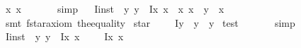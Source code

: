 \begin{isabellebody}
\isanewline
\isanewline
{}\isamarkupfalse%
\ {\isachardoublequoteopen}{\isacharparenleft}\isactrlbold {\isasymexists}x{\isachardot}\ x\ \isactrlbold {\isacharequal}\ {\isasymalpha}{\isacharparenright}\ {\isasymlongrightarrow}\ {\isasymA}{\isacharparenleft}{\isasymalpha}{\isacharparenright}{\isachardoublequoteclose}%
\isadelimproof
\ %
\endisadelimproof
%
\isatagproof
{}\isamarkupfalse%
\ simp%
\endisatagproof
{\isafoldproof}%
%
\isadelimproof
%
\endisadelimproof
\isanewline
\ \isanewline
\isanewline
\isanewline
{}\isamarkupfalse%
\ I{}{\isacharunderscore}inst\ {\isacharcolon}\ {\isachardoublequoteopen}\isactrlbold {\isasymforall}y{\isachardot}\ {\isacharparenleft}{\isacharparenleft}y\ \isactrlbold {\isacharequal}\ {\isacharparenleft}\isactrlbold Ix{\isachardot}\ {\isasymPhi}{\isacharparenleft}x{\isacharparenright}{\isacharparenright}{\isacharparenright}\ \isactrlbold {\isasymleftrightarrow}\ {\isacharparenleft}\isactrlbold {\isasymforall}x{\isachardot}\ {\isacharparenleft}{\isacharparenleft}x\ \isactrlbold {\isacharequal}\ y{\isacharparenright}\ \isactrlbold {\isasymleftrightarrow}\ {\isasymPhi}{\isacharparenleft}x{\isacharparenright}{\isacharparenright}{\isacharparenright}{\isacharparenright}{\isachardoublequoteclose}%
\isadelimproof
\ %
\endisadelimproof
%
\isatagproof
{}\isamarkupfalse%
\ {\isacharparenleft}smt\ f{\isacharunderscore}star{\isacharunderscore}axiom\ the{\isacharunderscore}equality{\isacharparenright}%
\endisatagproof
{\isafoldproof}%
%
\isadelimproof
%
\endisadelimproof
\isanewline
\isanewline
\isanewline
{}\isamarkupfalse%
\ star\ {\isacharparenleft}{\isachardoublequoteopen}{\isasymOtimes}{\isachardoublequoteclose}{\isacharparenright}\ \ {\isachardoublequoteopen}{\isasymOtimes}\ {\isasymequiv}\ \isactrlbold Iy{\isachardot}\ \isactrlbold {\isasymnot}\ {\isacharparenleft}y\ \isactrlbold {\isacharequal}\ y{\isacharparenright}{\isachardoublequoteclose}\isanewline
\isanewline
{}\isamarkupfalse%
\ test\ {\isacharcolon}\ {\isachardoublequoteopen}{\isasymOtimes}\ {\isacharequal}\ \isactrlbold {\isasymstar}{\isachardoublequoteclose}%
\isadelimproof
\ %
\endisadelimproof
%
\isatagproof
{}\isamarkupfalse%
\ simp%
\endisatagproof
{\isafoldproof}%
%
\isadelimproof
%
\endisadelimproof
\isanewline
\isanewline
\isanewline
{}\isamarkupfalse%
\ I{}{\isacharunderscore}inst\ {\isacharcolon}\ {\isachardoublequoteopen}\isactrlbold {\isasymnot}{\isacharparenleft}\isactrlbold {\isasymexists}y{\isachardot}\ y\ \isactrlbold {\isacharequal}\ {\isacharparenleft}\isactrlbold Ix{\isachardot}\ {\isasymPhi}{\isacharparenleft}x{\isacharparenright}{\isacharparenright}{\isacharparenright}\ \isactrlbold {\isasymrightarrow}\ \ {\isacharparenleft}{\isasymOtimes}\ \isactrlbold {\isacharequal}\ {\isacharparenleft}\isactrlbold Ix{\isachardot}\ {\isasymPhi}{\isacharparenleft}x{\isacharparenright}{\isacharparenright}{\isacharparenright}{\isachardoublequoteclose}%

\end{isabellebody}

